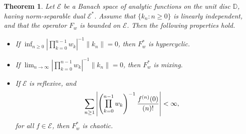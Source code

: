 \documentclass[12pt, reqno]{amsart}
\DeclareMathOperator*{\Mprod}{\text{\raisebox{0.25ex}{\scalebox{0.8}{$\prod$}}}}
\newtheorem{theorem}{Theorem}[section]
\theoremstyle{definition}
\theoremstyle{remark}
\numberwithin{equation}{section}
\begin{document}
\begin{theorem}\label{gen}
    Let $\mathcal{E}$ be a Banach space of analytic functions on the unit disc $\mathbb{D}$, having norm-separable dual $\mathcal{E}^*$. Assume that $\{k_n: n \geq 0\}$ is linearly independent, and that the operator $F_w$ is bounded on $\mathcal{E}$. Then the following  properties hold.
    \begin{itemize}
        \item[(i)] If $\inf_{n\geq 0} |\prod_{k=0}^{n-1} w_{k}|^{-1}\|k_{n}\|=0$, then $F_w^*$ is hypercyclic.
        \item[(ii)] If $\lim_{n\rightarrow \infty} |\prod_{k=0}^{n-1} w_{k}|^{-1}\|k_{n}\|=0$, then $F_w^*$ is mixing.
        \item[(iii)] If $\mathcal{E}$ is reflexive, and 
        \[
        \sum_{n\geq 1}\left|\left (\Mprod_{k=0}^{n-1} w_{k}\right)^{-1} \frac{f^{(n)}(0)}{{(n)}!}\right|<\infty,
        \]
        for all $f\in \mathcal{E}$, then $F_w^*$ is chaotic.
    \end{itemize}
\end{theorem}




\end{document}
